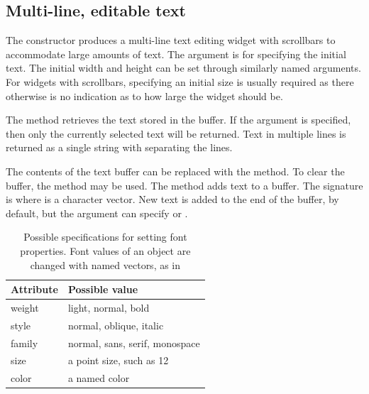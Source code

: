 \subsection{Multi-line, editable text}
\label{sec:gWidgets-multi-line-editable}

The  constructor produces a multi-line text editing
widget with scrollbars to accommodate large amounts of text. The
 argument is for specifying the initial text. The
initial width and height can be set through similarly named
arguments. For widgets with scrollbars, specifying an initial size is
usually required as there otherwise is no indication as to how large
the widget should be.

The  method retrieves the text stored in the
buffer. If the argument  is specified, then only the
currently selected text will be returned. Text in multiple lines is
returned as a single string with \qcode{\backslashn} separating the lines.

The contents of the text buffer can be replaced with the
 method. To clear the buffer, the
 method may be used. The 
method adds text to a buffer. The signature is 
where  is a character vector. New text is added to the end
of the buffer, by default, but the  argument
can specify  or .





\begin{table}
\centering
\label{tab:gWidgets-font-properties}
\caption{Possible specifications for setting font properties. Font values of an object are changed with named vectors, as in }
\begin{tabular}{@{}lp{}@{}}
\toprule

Attribute&Possible value\\
\midrule
weight&light, normal, bold\\style&normal, oblique, italic\\family&normal, sans, serif, monospace\\size&a point size, such as 12\\color&a named color
\\ \bottomrule
\end{tabular}
\end{table}
